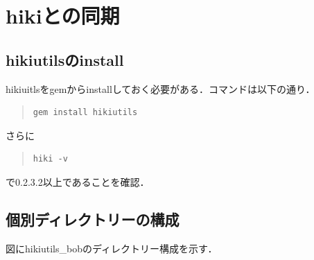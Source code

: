 \section{hikiとの同期}
\subsection{hikiutilsのinstall}
hikiuitlsをgemからinstallしておく必要がある．コマンドは以下の通り．
\begin{quote}\begin{verbatim}
gem install hikiutils
\end{verbatim}\end{quote}
さらに
\begin{quote}\begin{verbatim}
hiki -v
\end{verbatim}\end{quote}
で0.2.3.2以上であることを確認．

\subsection{個別ディレクトリーの構成}
図にhikiutils\_bobのディレクトリー構成を示す．

